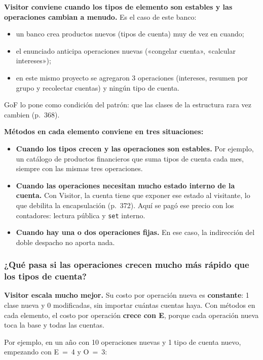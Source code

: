 \textbf{Visitor conviene cuando los tipos de elemento son estables y las operaciones cambian a
menudo.} Es el caso de este banco:
\begin{itemize}
  \item un banco crea productos nuevos (tipos de cuenta) muy de vez en cuando;
  \item el enunciado anticipa operaciones nuevas («congelar cuenta», «calcular intereses»);
  \item en este mismo proyecto se agregaron 3 operaciones (intereses, resumen por grupo y
        recolectar cuentas) y ningún tipo de cuenta.
\end{itemize}
GoF lo pone como condición del patrón: que las clases de la estructura rara vez cambien
(p.~368).

\textbf{Métodos en cada elemento conviene en tres situaciones:}
\begin{itemize}
  \item \textbf{Cuando los tipos crecen y las operaciones son estables.} Por ejemplo, un
        catálogo de productos financieros que suma tipos de cuenta cada mes, siempre con las
        mismas tres operaciones.
  \item \textbf{Cuando las operaciones necesitan mucho estado interno de la cuenta.} Con
        Visitor, la cuenta tiene que exponer ese estado al visitante, lo que debilita la
        encapsulación (p.~372). Aquí se pagó ese precio con los contadores: lectura pública y
        \texttt{set} interno.
  \item \textbf{Cuando hay una o dos operaciones fijas.} En ese caso, la indirección del doble
        despacho no aporta nada.
\end{itemize}

\subsubsection{¿Qué pasa si las operaciones crecen mucho más rápido que los tipos de cuenta?}

\textbf{Visitor escala mucho mejor.} Su costo por operación nueva es \textbf{constante}:
1 clase nueva y 0 modificadas, sin importar cuántas cuentas haya. Con métodos en cada
elemento, el costo por operación \textbf{crece con E}, porque cada operación nueva toca la base
y todas las cuentas.

Por ejemplo, en un año con 10 operaciones nuevas y 1 tipo de cuenta nuevo, empezando con
E~=~4 y O~=~3:

